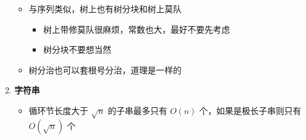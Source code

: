 \begin{enumerate}
\begin{itemize}
	\item 与序列类似，树上也有树分块和树上莫队
		\begin{itemize}
			\item 树上带修莫队很麻烦，常数也大，最好不要先考虑
			\item 树分块不要想当然
		\end{itemize}
	\item 树分治也可以套根号分治，道理是一样的
\end{itemize}

\item \textbf{字符串}

\begin{itemize}
	\item 循环节长度大于 $\sqrt n$ 的子串最多只有 $O(n)$ 个，如果是极长子串则只有 $O(\sqrt n)$ 个
\end{itemize}

\end{enumerate}
